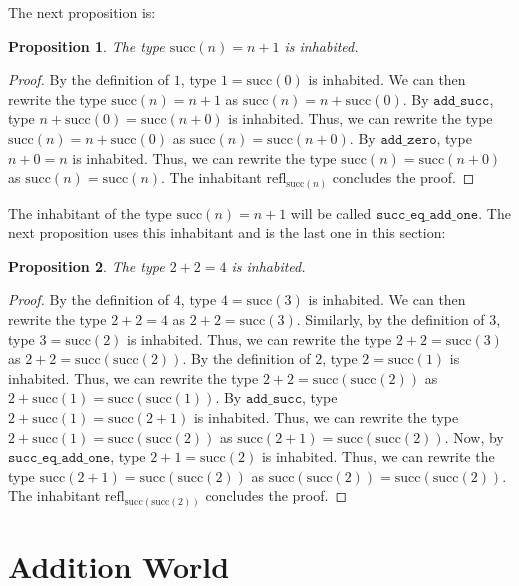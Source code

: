 \documentclass[12pt]{article}
\newtheorem{proposition}{Proposition}[section]
\theoremstyle{definition}
\theoremstyle{remark}
\begin{document}
The next proposition is:
\begin{proposition}
  The type $\text{succ}(n) = n+1$ is inhabited.
\end{proposition}
\begin{proof}
  By the definition of $1$, type $1 = \text{succ}(0)$ is inhabited. We can then rewrite the type $\text{succ}(n) = n+1$ as $\text{succ}(n) = n+\text{succ}(0)$. By $\texttt{add\_succ}$, type $n+\text{succ}(0) = \text{succ}(n+0)$ is inhabited. Thus, we can rewrite the type $\text{succ}(n) = n+\text{succ}(0)$ as $\text{succ}(n) = \text{succ}(n+0)$. By $\texttt{add\_zero}$, type $n+0 = n$ is inhabited. Thus, we can rewrite the type $\text{succ}(n) = \text{succ}(n+0)$ as $\text{succ}(n) = \text{succ}(n)$.
  The inhabitant $\text{refl}_{\text{succ}(n)}$ concludes the proof.
\end{proof}

The inhabitant of the type $\text{succ}(n) = n+1$ will be called $\texttt{succ\_eq\_add\_one}$. The next proposition uses this inhabitant and is the last one in this section:

\begin{proposition}
  The type $2+2=4$ is inhabited.
\end{proposition}
\begin{proof}
  By the definition of $4$, type $4 = \text{succ}(3)$ is inhabited. We can then rewrite the type $2+2=4$ as $2+2=\text{succ}(3)$. Similarly, by the definition of $3$, type $3 = \text{succ}(2)$ is inhabited. Thus, we can rewrite the type $2+2=\text{succ}(3)$ as $2+2=\text{succ}(\text{succ}(2))$. By the definition of $2$, type $2 = \text{succ}(1)$ is inhabited. Thus, we can rewrite the type $2+2=\text{succ}(\text{succ}(2))$ as $2+\text{succ}(1)=\text{succ}(\text{succ}(1))$. By $\texttt{add\_succ}$, type $2+\text{succ}(1)=\text{succ}(2+1)$ is inhabited. Thus, we can rewrite the type $2+\text{succ}(1)=\text{succ}(\text{succ}(2))$ as $\text{succ}(2+1)=\text{succ}(\text{succ}(2))$. Now, by $\texttt{succ\_eq\_add\_one}$, type $2+1=\text{succ}(2)$ is inhabited. Thus, we can rewrite the type $\text{succ}(2+1)=\text{succ}(\text{succ}(2))$ as $\text{succ}(\text{succ}(2))=\text{succ}(\text{succ}(2))$.
  The inhabitant $\text{refl}_{\text{succ}(\text{succ}(2))}$ concludes the proof.
\end{proof} 

\section{Addition World}
\end{document}
